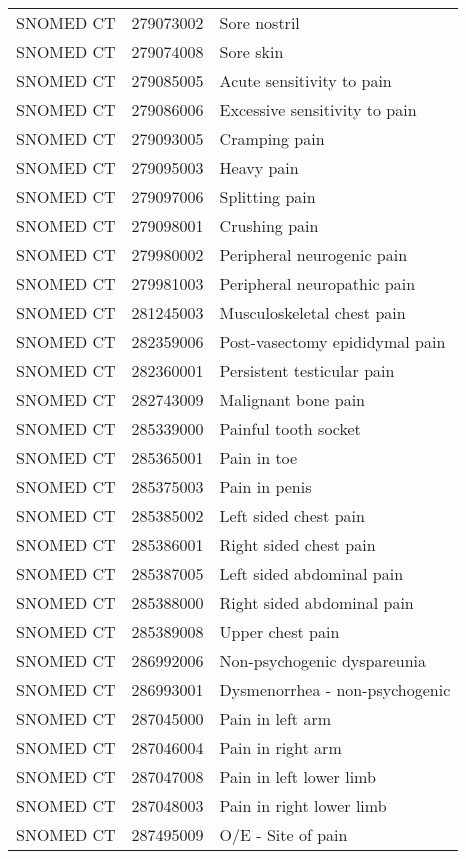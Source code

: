\begin{longtable}{p{}p{}p{}}
  SNOMED CT & 279073002 & Sore nostril \\ 
  SNOMED CT & 279074008 & Sore skin \\ 
  SNOMED CT & 279085005 & Acute sensitivity to pain \\ 
  SNOMED CT & 279086006 & Excessive sensitivity to pain \\ 
  SNOMED CT & 279093005 & Cramping pain \\ 
  SNOMED CT & 279095003 & Heavy pain \\ 
  SNOMED CT & 279097006 & Splitting pain \\ 
  SNOMED CT & 279098001 & Crushing pain \\ 
  SNOMED CT & 279980002 & Peripheral neurogenic pain \\ 
  SNOMED CT & 279981003 & Peripheral neuropathic pain \\ 
  SNOMED CT & 281245003 & Musculoskeletal chest pain \\ 
  SNOMED CT & 282359006 & Post-vasectomy epididymal pain \\ 
  SNOMED CT & 282360001 & Persistent testicular pain \\ 
  SNOMED CT & 282743009 & Malignant bone pain \\ 
  SNOMED CT & 285339000 & Painful tooth socket \\ 
  SNOMED CT & 285365001 & Pain in toe \\ 
  SNOMED CT & 285375003 & Pain in penis \\ 
  SNOMED CT & 285385002 & Left sided chest pain \\ 
  SNOMED CT & 285386001 & Right sided chest pain \\ 
  SNOMED CT & 285387005 & Left sided abdominal pain \\ 
  SNOMED CT & 285388000 & Right sided abdominal pain \\ 
  SNOMED CT & 285389008 & Upper chest pain \\ 
  SNOMED CT & 286992006 & Non-psychogenic dyspareunia \\ 
  SNOMED CT & 286993001 & Dysmenorrhea - non-psychogenic \\ 
  SNOMED CT & 287045000 & Pain in left arm \\ 
  SNOMED CT & 287046004 & Pain in right arm \\ 
  SNOMED CT & 287047008 & Pain in left lower limb \\ 
  SNOMED CT & 287048003 & Pain in right lower limb \\ 
  SNOMED CT & 287495009 & O/E - Site of pain \\ 

\end{longtable}

